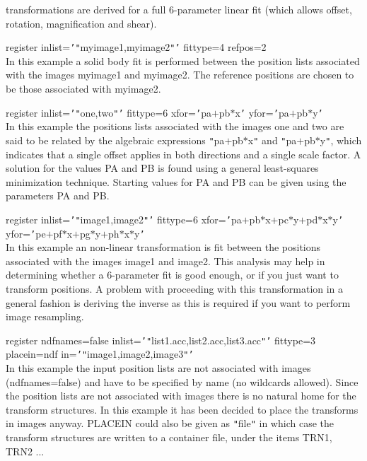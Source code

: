 \documentclass[twoside,11pt]{article}
\renewcommand{\_}{\texttt{\symbol{95}}}
\newcommand{\qt}[1]{{\tt "}#1{\tt "}}
\newcommand{\qs}[1]{{\tt '}#1{\tt '}}
\newcommand{\sstexamplesubsection}[2]{\sloppy \item{\ssttt #1} \mbox{} \\ #2 }
\newcommand{\sstnotes}[1]{\item[Notes:] \mbox{} \\[1.3ex] #1}
\newcommand{\sstitemlist}[1]{
  \mbox{} \\
  \vspace{-3.5ex}
  \begin{itemize}
     #1
  \end{itemize}
}
\newcommand{\sstexamplesubsection}[2]{\item[{\ssttt #1}] #2}
\newcommand{\sstnotes}[1]{\item[Notes:] #1 }
\newcommand{\sstitemlist}[1]{
      \begin{itemize}
         #1
      \end{itemize}
      \\
   }
\begin{document}
{{{         transformations are derived for a full 6-parameter linear fit
         (which allows offset, rotation, magnification and shear).
      }
      \sstexamplesubsection{
         register inlist=\qs{\qt{myimage1,myimage2}} fittype=4 refpos=2
      } {
         In this example a solid body fit is performed between the
         position lists associated with the images myimage1 and myimage2.
         The reference positions are chosen to be those associated with
         myimage2.
      }
      \sstexamplesubsection{
         register inlist=\qs{\qt{one,two}} fittype=6
         xfor=\qs{pa$+$pb$*$x} yfor=\qs{pa$+$pb$*$y}
      } {
         In this example the positions lists associated with the images
         one and two are said to be related by the algebraic
         expressions \qt{pa$+$pb$*$x} and \qt{pa$+$pb$*$y}, which
         indicates that a
         single offset applies in both directions and a single scale
         factor. A solution for the values PA and PB is found using a
         general least-squares minimization technique. Starting values
         for PA and PB can be given using the parameters PA and PB.
      }
      \sstexamplesubsection{
         register inlist=\qs{\qt{image1,image2}} fittype=6
                  xfor=\qs{pa$+$pb$*$x$+$pc$*$y$+$pd$*$x$*$y}
                  yfor=\qs{pe$+$pf$*$x$+$pg$*$y$+$ph$*$x$*$y}
      } {
         In this example an non-linear transformation is fit between the
         positions associated with the images image1 and image2. This analysis
         may help in determining whether a 6-parameter fit is good
         enough, or if you just want to transform positions. A problem
         with proceeding with this transformation in a general fashion
         is deriving the inverse as this is required if you want to
         perform image resampling.
      }
      \sstexamplesubsection{
         register ndfnames=false inlist=\qs{\qt{list1.acc,list2.acc,list3.acc}}
               fittype=3 placein=ndf in=\qs{\qt{image1,image2,image3}}
      } {
         In this example the input position lists are not associated
         with images (ndfnames=false) and have to be specified by name
         (no wildcards allowed). Since the position lists are not
         associated with images there is no natural home for the
         transform structures. In this example it has been decided to
         place the transforms in images anyway. PLACEIN could also be
         given as \qt{file} in which case the transform structures are
         written to a container file, under the items TRN\_1, TRN\_2 ...
      }
   }
   \sstnotes{
      \sstitemlist{

}}}
\end{document}
